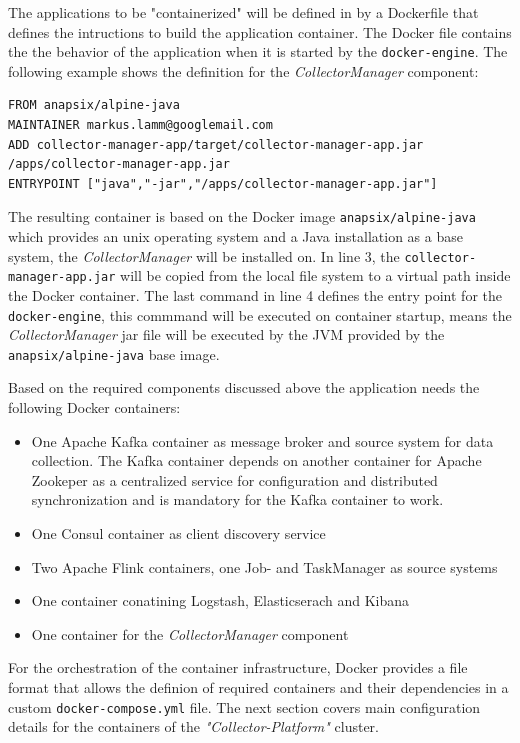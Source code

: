 The applications to be "containerized" will be defined in by a Dockerfile that defines the intructions to build the application container.
The Docker file contains the the behavior of the application when it is started by the \verb|docker-engine|. The following
example shows the definition for the \textit{CollectorManager} component:

\begin{lstlisting}[caption={Dockerfile "CollectorManager"}, captionpos=b, label={lst:dockerfile}]
FROM anapsix/alpine-java
MAINTAINER markus.lamm@googlemail.com
ADD collector-manager-app/target/collector-manager-app.jar /apps/collector-manager-app.jar
ENTRYPOINT ["java","-jar","/apps/collector-manager-app.jar"]
\end{lstlisting}

The resulting container is based on the Docker image \verb|anapsix/alpine-java| which provides an unix operating system and a Java
installation as a base system, the \textit{CollectorManager} will be installed on. In line 3, the \verb|collector-manager-app.jar|
will be copied from the local file system to a virtual path inside the Docker container. The last command in line 4 defines the entry point
for the \verb|docker-engine|, this commmand will be executed on container startup, means the \textit{CollectorManager} jar file will
be executed by the JVM provided by the \verb|anapsix/alpine-java| base image.

Based on the required components discussed above the application needs the following Docker containers:

\begin{itemize}
	\item One Apache Kafka container as message broker and source system for data collection. The Kafka container depends on
	another container for Apache Zookeper as a centralized service for configuration and distributed synchronization and is mandatory
	for the Kafka container to work.
	\item One Consul container as client discovery service
	\item Two Apache Flink containers, one Job- and TaskManager as source systems
	\item One container conatining Logstash, Elasticserach and Kibana
	\item One container for the \textit{CollectorManager} component
\end{itemize}

For the orchestration of the container infrastructure, Docker provides a file format that allows the definion of required containers
and their dependencies in a custom \verb|docker-compose.yml| file. The next section covers main configuration details for the containers
of the \textit{"Collector-Platform"} cluster.

